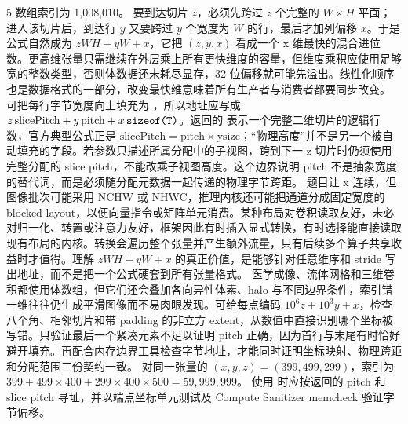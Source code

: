 \begin{solutionexercise}{5}
\conclusionheading 数组索引为 1,008,010。
\discussionheading
{}
要到达切片 $z$，必须先跨过 $z$ 个完整的 $W\times H$ 平面；进入该切片后，到达行 $y$ 又要跨过 $y$ 个宽度为 $W$ 的行，最后才加列偏移 $x$。于是公式自然成为 $zWH+yW+x$，它把 $(z,y,x)$ 看成一个 x 维最快的混合进位数。更高维张量只需继续在外层乘上所有更快维度的容量，但维度乘积应使用足够宽的整数类型，否则体数据还未耗尽显存，32 位偏移就可能先溢出。线性化顺序也是数据格式的一部分，改变最快维意味着所有生产者与消费者都要同步改变。
 可把每行字节宽度向上填充为 ，所以地址应写成 $z\,\text{slicePitch}+y\,\text{pitch}+x\,\code{sizeof(T)}$。返回的  表示一个完整二维切片的逻辑行数，官方典型公式正是 $\text{slicePitch}=\text{pitch}\times\text{ysize}$；“物理高度”并不是另一个被自动填充的字段。若参数只描述所属分配中的子视图，跨到下一 z 切片时仍须使用完整分配的 slice pitch，不能改乘子视图高度。这个边界说明 pitch 不是抽象宽度的替代词，而是必须随分配元数据一起传递的物理字节跨距。
题目让 x 连续，但图像批次可能采用 NCHW 或 NHWC，推理内核还可能把通道分成固定宽度的 blocked layout，以便向量指令或矩阵单元消费。某种布局对卷积读取友好，未必对归一化、转置或注意力友好，框架因此有时插入显式转换，有时选择能直接读取现有布局的内核。转换会遍历整个张量并产生额外流量，只有后续多个算子共享收益时才值得。理解 $zWH+yW+x$ 的真正价值，是能够针对任意维序和 stride 写出地址，而不是把一个公式硬套到所有张量格式。
医学成像、流体网格和三维卷积都使用体数组，但它们还会叠加各向异性体素、halo 与不同边界条件，索引错一维往往仍生成平滑图像而不易肉眼发现。可给每点编码 $10^6z+10^3y+x$，检查八个角、相邻切片和带 padding 的非立方 extent，从数值中直接识别哪个坐标被写错。只验证最后一个紧凑元素不足以证明 pitch 正确，因为首行与末尾有时恰好避开填充。再配合内存边界工具检查字节地址，才能同时证明坐标映射、物理跨距和分配范围三份契约一致。
\variantheading 对同一张量的 $(x,y,z)=(399,499,299)$，索引为 $399+499\times400+299\times400\times500=59{,}999{,}999$。
\practiceheading 使用  时应按返回的 pitch 和 slice pitch 寻址，并以端点坐标单元测试及 Compute Sanitizer memcheck 验证字节偏移。
\end{solutionexercise}
